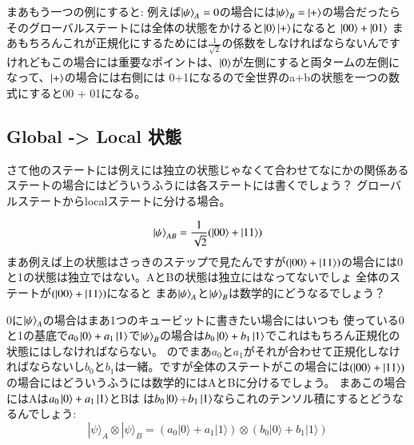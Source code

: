 まあもう一つの例にすると:
例えば$\ket{\psi}_A=0$の場合には$\ket{\psi}_B = \ket{+}$の場合だったら
そのグローバルステートには全体の状態をかけると$\ket{0}\ket{+}$になると
$\ket{00} + \ket{01}$ まあもちろんこれが正規化にするためには$\frac{1}{\sqrt2}$の係数をしなければならないんですけれどもこの場合には重要なポイントは、$\ket{0}$が左側にすると両タームの左側になって、$\ket{+}$の場合には右側には 0+1になるので全世界のa+bの状態を一つの数式にすると00 + 01になる。

\subsection{Global -> Local 状態}
さて他のステートには例えには独立の状態じゃなくて合わせてなにかの関係あるステートの場合にはどういうふうには各ステートには書くでしょう？
グローバルステートからlocalステートに分ける場合。

\begin{equation}
\ket{\psi}_{AB} = \frac{1}{\sqrt2}(\ket{00} + \ket{11})
\end{equation}
まあ例えば上の状態はさっきのステップで見たんですが$(\ket{00} + \ket{11})$の場合には0
と1の状態は独立ではない。AとBの状態は独立にはなってないでしょ
全体のステートが$(\ket{00} + \ket{11})$になると
まあ$\ket{\psi}_A$と$\ket{\psi}_B$は数学的にどうなるでしょう？

0に$\ket{\psi}_A$の場合はまあ1つのキュービットに書きたい場合にはいつも
使っている0と1の基底で$a_0\ket{0}+a_1\ket{1}$で$\ket{\psi}_B$の場合は$b_0\ket{0}+b_1\ket{1}$でこれはもちろん正規化の状態にはしなければならない。
のでまあ$a_0$と$a_1$がそれが合わせて正規化しなければならないし$b_0$と$b_1$は一緒。ですが全体のステートがこの場合には$(\ket{00} +\ket{11})$の場合にはどういうふうには数学的にはAとBに分けるでしょう。
まあこの場合にはAは$a_0\ket{0}+a_1\ket{1}$とBは
は$b_0\ket{0}$+$b_1\ket{1}$ならこれのテンソル積にするとどうなるんでしょう:
\begin{equation}
|\psi\rangle_{A} \otimes|\psi\rangle_{B}=\left(a_{0}|0\rangle+a_{1}|1\rangle\right) \otimes\left(b_{0}|0\rangle+b_{1}|1\rangle\right)
\end{equation}

